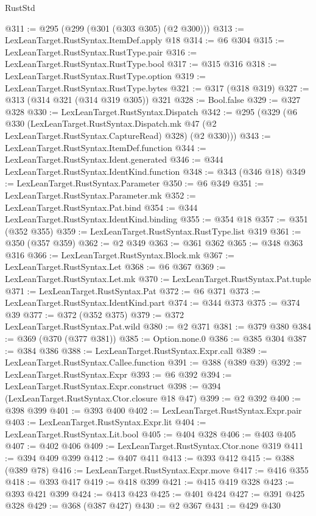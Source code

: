 \begin{lexlean}{RustStd}
\begin{coremodule}
@311 := @295 (@299 (@301 (@303 @305) (@2 @300)))
@313 := LexLeanTarget.RustSyntax.ItemDef.apply @18
@314 := @6 @304
@315 := LexLeanTarget.RustSyntax.RustType.pair
@316 := LexLeanTarget.RustSyntax.RustType.bool
@317 := @315 @316
@318 := LexLeanTarget.RustSyntax.RustType.option
@319 := LexLeanTarget.RustSyntax.RustType.bytes
@321 := @317 (@318 @319)
@327 := @313 (@314 @321 (@314 @319 @305)) @321
@328 := Bool.false
@329 := @327 @328
@330 := LexLeanTarget.RustSyntax.Dispatch
@342 := @295
    (@329
      (@6
        @330
        (LexLeanTarget.RustSyntax.Dispatch.mk @47 (@2 LexLeanTarget.RustSyntax.CaptureRead) @328)
        (@2 @330)))
@343 := LexLeanTarget.RustSyntax.ItemDef.function
@344 := LexLeanTarget.RustSyntax.Ident.generated
@346 := @344 LexLeanTarget.RustSyntax.IdentKind.function
@348 := @343 (@346 @18)
@349 := LexLeanTarget.RustSyntax.Parameter
@350 := @6 @349
@351 := LexLeanTarget.RustSyntax.Parameter.mk
@352 := LexLeanTarget.RustSyntax.Pat.bind
@354 := @344 LexLeanTarget.RustSyntax.IdentKind.binding
@355 := @354 @18
@357 := @351 (@352 @355)
@359 := LexLeanTarget.RustSyntax.RustType.list @319
@361 := @350 (@357 @359)
@362 := @2 @349
@363 := @361 @362
@365 := @348 @363 @316
@366 := LexLeanTarget.RustSyntax.Block.mk
@367 := LexLeanTarget.RustSyntax.Let
@368 := @6 @367
@369 := LexLeanTarget.RustSyntax.Let.mk
@370 := LexLeanTarget.RustSyntax.Pat.tuple
@371 := LexLeanTarget.RustSyntax.Pat
@372 := @6 @371
@373 := LexLeanTarget.RustSyntax.IdentKind.part
@374 := @344 @373
@375 := @374 @39
@377 := @372 (@352 @375)
@379 := @372 LexLeanTarget.RustSyntax.Pat.wild
@380 := @2 @371
@381 := @379 @380
@384 := @369 (@370 (@377 @381))
@385 := Option.none.{0}
@386 := @385 @304
@387 := @384 @386
@388 := LexLeanTarget.RustSyntax.Expr.call
@389 := LexLeanTarget.RustSyntax.Callee.function
@391 := @388 (@389 @39)
@392 := LexLeanTarget.RustSyntax.Expr
@393 := @6 @392
@394 := LexLeanTarget.RustSyntax.Expr.construct
@398 := @394 (LexLeanTarget.RustSyntax.Ctor.closure @18 @47)
@399 := @2 @392
@400 := @398 @399
@401 := @393 @400
@402 := LexLeanTarget.RustSyntax.Expr.pair
@403 := LexLeanTarget.RustSyntax.Expr.lit
@404 := LexLeanTarget.RustSyntax.Lit.bool
@405 := @404 @328
@406 := @403 @405
@407 := @402 @406
@409 := LexLeanTarget.RustSyntax.Ctor.none @319
@411 := @394 @409 @399
@412 := @407 @411
@413 := @393 @412
@415 := @388 (@389 @78)
@416 := LexLeanTarget.RustSyntax.Expr.move
@417 := @416 @355
@418 := @393 @417
@419 := @418 @399
@421 := @415 @419 @328
@423 := @393 @421 @399
@424 := @413 @423
@425 := @401 @424
@427 := @391 @425 @328
@429 := @368 (@387 @427)
@430 := @2 @367
@431 := @429 @430

\end{coremodule}
\end{lexlean}
